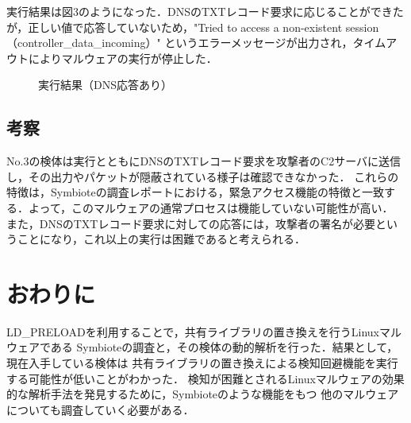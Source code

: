 \documentclass[submit,techreq,noauthor]{eco}	%
\begin{document}
  実行結果は図3のようになった．DNSのTXTレコード要求に応じることができたが，正しい値で応答していないため，"Tried to access a non-existent session（controller\_data\_incoming）"
  というエラーメッセージが出力され，タイムアウトによりマルウェアの実行が停止した．

  \begin{figure}[H]
    \centering
    \caption{実行結果（DNS応答あり）}
    \label{fig:003}
  \end{figure}

\subsection{考察}
No.3の検体は実行とともにDNSのTXTレコード要求を攻撃者のC2サーバに送信し，その出力やパケットが隠蔽されている様子は確認できなかった．
これらの特徴は，Symbioteの調査レポートにおける，緊急アクセス機能の特徴と一致する．よって，このマルウェアの通常プロセスは機能していない可能性が高い．
また，DNSのTXTレコード要求に対しての応答には，攻撃者の署名が必要ということになり，これ以上の実行は困難であると考えられる．\\

\section{おわりに}
LD\_PRELOADを利用することで，共有ライブラリの置き換えを行うLinuxマルウェアである
Symbioteの調査と，その検体の動的解析を行った．結果として，現在入手している検体は
共有ライブラリの置き換えによる検知回避機能を実行する可能性が低いことがわかった．
検知が困難とされるLinuxマルウェアの効果的な解析手法を発見するために，Symbioteのような機能をもつ
他のマルウェアについても調査していく必要がある．

\setlength\baselineskip{12pt}
{\small
	
	
}
\end{document}
